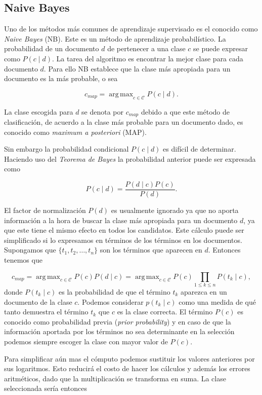 \documentclass{llncs}
\DeclareMathOperator*{\argmax}{arg\,max}
\begin{document}
	\subsection{Naive Bayes}

		Uno de los m\'etodos m\'as comunes de aprendizaje supervisado es el conocido como \emph{Naive Bayes} (NB). Este es un m\'etodo de aprendizaje probabil\'istico. La probabilidad de un documento $d$ de pertenecer a una clase $c$ se puede expresar como $P(c\mid d)$. La tarea del algoritmo es encontrar la mejor clase para cada documento $d$. Para ello NB establece que la clase m\'as apropiada para un documento es la m\'as probable, o sea
		
		\[
		c_{map} = \argmax_{c\in\mathcal{C}} P(c \mid d).
		\]
		
		La clase escogida para $d$ se denota por $c_{map}$ debido a que este m\'etodo de clasificaci\'on, de acuerdo a la clase m\'as probable para un documento dado, es conocido como \emph{maximum a posteriori} (MAP).
		
		Sin embargo la probabilidad condicional $P(c \mid d)$ es dif\'icil de determinar. Haciendo uso del \emph{Teorema de Bayes} la probabilidad anterior puede ser expresada como
		
		\[
		P(c \mid d) =\frac{ P(d\mid c) P(c)}{P(d)}.
		\]
		
		El factor de normalizaci\'on $P(d)$ es usualmente ignorado ya que no aporta informaci\'on a la hora de buscar la clase m\'as apropiada para un documento $d$, ya que este tiene el mismo efecto en todos los candidatos. Este c\'alculo puede ser simplificado si lo expresamos en t\'erminos de los t\'erminos en los documentos. Supongamos que $\{t_1, t_2, \dots , t_n \}$ son los t\'erminos que aparecen en $d$. Entonces tenemos que  
		
		\[
			c_{map} = \argmax_{c\in\mathcal{C}} P(c) P(d \mid c) = \argmax_{c\in\mathcal{C}} P(c) \prod_{1\leq k\leq n} P(t_k \mid c),
		\]
		donde $P(t_k \mid c)$ es la probabilidad de que el t\'ermino $t_k$ aparezca en un documento de la clase $c$. Podemos considerar $p(t_k \mid c)$ como una medida de qu\'e tanto demuestra el t\'ermino $t_k$ que $c$ es la clase correcta. El t\'ermino $P(c)$ es conocido como probabilidad previa (\emph{prior probability}) y en caso de que la informaci\'on aportada por los t\'erminos no sea determinante en la selecci\'on podemos siempre escoger la clase con mayor valor de $P(c)$.
		
		Para simplificar a\'un mas el c\'omputo podemos sustituir los valores anteriores por sus logaritmos. Esto reducir\'a el costo de hacer los c\'alculos y adem\'as los errores aritm\'eticos, dado que la multiplicaci\'on se transforma en suma. La clase seleccionada ser\'ia entonces
		
\end{document}
